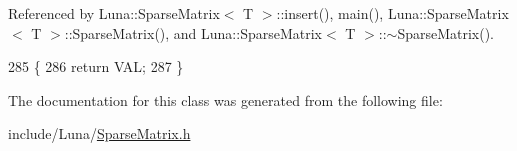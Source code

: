Referenced by Luna\+::\+Sparse\+Matrix$<$ T $>$\+::insert(), main(), Luna\+::\+Sparse\+Matrix$<$ T $>$\+::\+Sparse\+Matrix(), and Luna\+::\+Sparse\+Matrix$<$ T $>$\+::$\sim$\+Sparse\+Matrix().


\begin{DoxyCode}
285   \{
286     \textcolor{keywordflow}{return} VAL;
287   \}
\end{DoxyCode}


The documentation for this class was generated from the following file\+:\begin{DoxyCompactItemize}
\item 
include/\+Luna/\hyperlink{SparseMatrix_8h}{Sparse\+Matrix.\+h}\end{DoxyCompactItemize}
